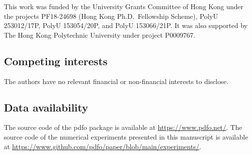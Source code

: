 \documentclass[
    smallextended,  %
    final,        %
]{svjour3}
\begin{document}
This work was funded by the University Grants Committee of Hong Kong under the
projects PF18-24698 (Hong Kong Ph.D.~Fellowship Scheme), PolyU 253012/17P, PolyU 153054/20P,
and PolyU 153066/21P.
It was also supported by The Hong Kong Polytechnic University under project P0009767.

\subsection{Competing interests}

The authors have no relevant financial or non-financial interests to disclose.

\subsection{Data availability}

The source code of the \gls{pdfo} package is available at \mbox{\url{https://www.pdfo.net/}}.
The source code of the numerical experiments presented in this manuscript is available at
\mbox{\url{https://www.github.com/pdfo/paper/blob/main/experiments/}}.



\end{document}
